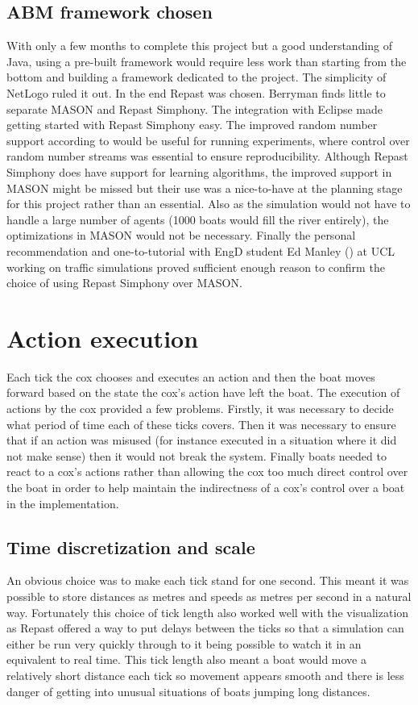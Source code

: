     \subsection{ABM framework chosen}
    With only a few months to complete this project but a good understanding of Java, using a pre-built framework would require less work than starting from the bottom and building a framework dedicated to the project. The simplicity of NetLogo ruled it out. In the end Repast was chosen. Berryman finds little to separate MASON and Repast Simphony. The integration with Eclipse made getting started with Repast Simphony easy. The improved random number support according to \cite{} would be useful for running experiments, where control over random number streams was essential to ensure reproducibility. Although Repast Simphony does have support for learning algorithms, the improved support in MASON might be missed but their use was a nice-to-have at the planning stage for this project rather than an essential. Also as the simulation would not have to handle a large number of agents (1000 boats would fill the river entirely), the optimizations in MASON would not be necessary. Finally the personal recommendation and one-to-tutorial with EngD student Ed Manley (\cite{Manley2012}) at UCL working on traffic simulations proved sufficient enough reason to confirm the choice of using Repast Simphony over MASON.
  
  \section{Action execution}
    Each tick the cox chooses and executes an action and then the boat moves forward based on the state the cox's action have left the boat. The execution of actions by the cox provided a few problems. Firstly, it was  necessary to decide what period of time each of these ticks covers. Then it was necessary to ensure that if an action was misused (for instance executed in a situation where it did not make sense) then it would not break the system. Finally boats needed to react to a cox's actions rather than allowing the cox too much direct control over the boat in order to help maintain the indirectness of a cox's control over a boat in the implementation.
    
    \subsection{Time discretization and scale}
    An obvious choice was to make each tick stand for one second. This meant it was possible to store distances as metres and speeds as metres per second in a natural way. Fortunately this choice of tick length also worked well with the visualization as Repast offered a way to put delays between the ticks so that a simulation can either be run very quickly through to it being possible to watch it in an equivalent to real time. This tick length also meant a boat would move a relatively short distance each tick so movement appears smooth and there is less danger of getting into unusual situations of boats jumping long distances.
    
